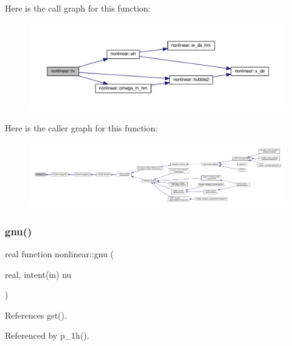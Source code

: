 Here is the call graph for this function\+:
\nopagebreak
\begin{figure}[H]
\begin{center}
\leavevmode
\includegraphics[width=350pt]{namespacenonlinear_aa6814235c0bd98fe3c05073b03b16fac_cgraph}
\end{center}
\end{figure}
Here is the caller graph for this function\+:
\nopagebreak
\begin{figure}[H]
\begin{center}
\leavevmode
\includegraphics[width=350pt]{namespacenonlinear_aa6814235c0bd98fe3c05073b03b16fac_icgraph}
\end{center}
\end{figure}
\mbox{\label{namespacenonlinear_a236c113538d97686a8f8e286b29bc073}} 
\subsubsection{\texorpdfstring{gnu()}{gnu()}}
{\footnotesize\ttfamily real function nonlinear\+::gnu (\begin{DoxyParamCaption}\item[{real, intent(in)}]{nu }\end{DoxyParamCaption})\hspace{0.3cm}{\ttfamily [private]}}



References gst().



Referenced by p\+\_\+1h().

